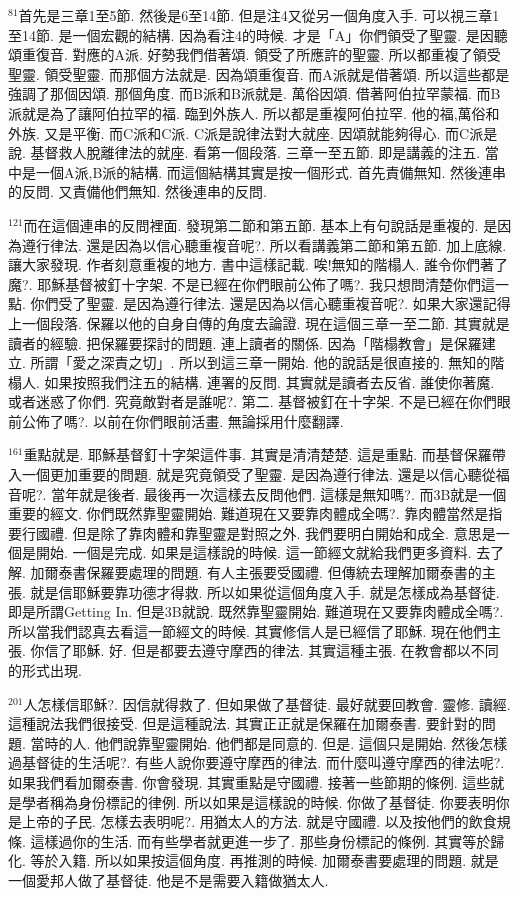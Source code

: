 \documentclass{book}
\begin{document}
$^{81}$首先是三章1至5節.
然後是6至14節.
但是注4又從另一個角度入手.
可以視三章1至14節.
是一個宏觀的結構.
因為看注4的時候.
才是「A」你們領受了聖靈.
是因聽頌重復音.
對應的A派.
好勢我們借著頌.
領受了所應許的聖靈.
所以都重複了領受聖靈.
領受聖靈.
而那個方法就是.
因為頌重復音.
而A派就是借著頌.
所以這些都是強調了那個因頌.
那個角度.
而B派和B派就是.
萬俗因頌.
借著阿伯拉罕蒙福.
而B派就是為了讓阿伯拉罕的福.
臨到外族人.
所以都是重複阿伯拉罕.
他的福,萬俗和外族.
又是平衡.
而C派和C派.
C派是說律法對大就座.
因頌就能夠得心.
而C派是說.
基督救人脫離律法的就座.
看第一個段落.
三章一至五節.
即是講義的注五.
當中是一個A派,B派的結構.
而這個結構其實是按一個形式.
首先責備無知.
然後連串的反問.
又責備他們無知.
然後連串的反問.

$^{121}$而在這個連串的反問裡面.
發現第二節和第五節.
基本上有句說話是重複的.
是因為遵行律法.
還是因為以信心聽重複音呢?.
所以看講義第二節和第五節.
加上底線.
讓大家發現.
作者刻意重複的地方.
書中這樣記載.
唉!無知的階榻人.
誰令你們著了魔?.
耶穌基督被釘十字架.
不是已經在你們眼前公佈了嗎?.
我只想問清楚你們這一點.
你們受了聖靈.
是因為遵行律法.
還是因為以信心聽重複音呢?.
如果大家還記得上一個段落.
保羅以他的自身自傳的角度去論證.
現在這個三章一至二節.
其實就是讀者的經驗.
把保羅要探討的問題.
連上讀者的關係.
因為「階榻教會」是保羅建立.
所謂「愛之深責之切」.
所以到這三章一開始.
他的說話是很直接的.
無知的階榻人.
如果按照我們注五的結構.
連署的反問.
其實就是讀者去反省.
誰使你著魔.
或者迷惑了你們.
究竟敵對者是誰呢?.
第二.
基督被釘在十字架.
不是已經在你們眼前公佈了嗎?.
以前在你們眼前活畫.
無論採用什麼翻譯.

$^{161}$重點就是.
耶穌基督釘十字架這件事.
其實是清清楚楚.
這是重點.
而基督保羅帶入一個更加重要的問題.
就是究竟領受了聖靈.
是因為遵行律法.
還是以信心聽從福音呢?.
當年就是後者.
最後再一次這樣去反問他們.
這樣是無知嗎?.
而3B就是一個重要的經文.
你們既然靠聖靈開始.
難道現在又要靠肉體成全嗎?.
靠肉體當然是指要行國禮.
但是除了靠肉體和靠聖靈是對照之外.
我們要明白開始和成全.
意思是一個是開始.
一個是完成.
如果是這樣說的時候.
這一節經文就給我們更多資料.
去了解.
加爾泰書保羅要處理的問題.
有人主張要受國禮.
但傳統去理解加爾泰書的主張.
就是信耶穌要靠功德才得救.
所以如果從這個角度入手.
就是怎樣成為基督徒.
即是所謂Getting In.
但是3B就說.
既然靠聖靈開始.
難道現在又要靠肉體成全嗎?.
所以當我們認真去看這一節經文的時候.
其實修信人是已經信了耶穌.
現在他們主張.
你信了耶穌.
好.
但是都要去遵守摩西的律法.
其實這種主張.
在教會都以不同的形式出現.

$^{201}$人怎樣信耶穌?.
因信就得救了.
但如果做了基督徒.
最好就要回教會.
靈修.
讀經.
這種說法我們很接受.
但是這種說法.
其實正正就是保羅在加爾泰書.
要針對的問題.
當時的人.
他們說靠聖靈開始.
他們都是同意的.
但是.
這個只是開始.
然後怎樣過基督徒的生活呢?.
有些人說你要遵守摩西的律法.
而什麼叫遵守摩西的律法呢?.
如果我們看加爾泰書.
你會發現.
其實重點是守國禮.
接著一些節期的條例.
這些就是學者稱為身份標記的律例.
所以如果是這樣說的時候.
你做了基督徒.
你要表明你是上帝的子民.
怎樣去表明呢?.
用猶太人的方法.
就是守國禮.
以及按他們的飲食規條.
這樣過你的生活.
而有些學者就更進一步了.
那些身份標記的條例.
其實等於歸化.
等於入籍.
所以如果按這個角度.
再推測的時候.
加爾泰書要處理的問題.
就是一個愛邦人做了基督徒.
他是不是需要入籍做猶太人.
\end{document}
